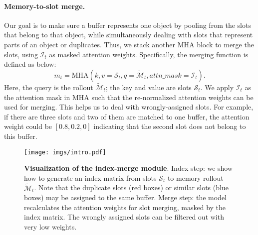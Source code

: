 \paragraph{Memory-to-slot merge.} 
Our goal is to make sure a buffer represents one object by pooling from the slots that belong to that object, while simultaneously dealing with slots that represent parts of an object or duplicates. Thus,
we stack another MHA
block to merge the slots, using $\mathcal{I}_t$ as masked attention weights.  Specifically, the merging function is defined as below:
\begin{equation}
    m_t=\text{MHA}(k,v=\mathcal{S}_t, q=\tilde {\mathcal{M}}_t, attn\_mask=\mathcal{I}_t).
\end{equation}
Here, the query is the rollout $\tilde {\mathcal{M}}_t$; the key and value are slots $\mathcal{S}_t$. We apply $\mathcal{I}_t$ as the attention mask in MHA such that the re-normalized attention weights can be used for merging. This helps us to deal with wrongly-assigned slots. For example, if there are three slots and two of them are matched to one buffer, the attention weight could be $[0.8, 0.2, 0]$ indicating that the second slot does not belong to this buffer.
\begin{figure}[!ht]
	\centering
	\texttt{[image: imgs/intro.pdf]}
 \vspace{+0.3cm}
\caption{\textbf{Visualization of the index-merge module}. Index step: we show how to generate an index matrix from slots $\mathcal{S}_t$ to memory rollout $\tilde{\mathcal{M}}_t$. Note that the duplicate slots (red boxes) or similar slots (blue boxes) may be assigned to the same buffer. Merge step: the model recalculates the attention weights for slot merging, masked by the index matrix. The wrongly assigned slots can be filtered out with very low weights.
 }
\label{fig:intro}
\end{figure}

